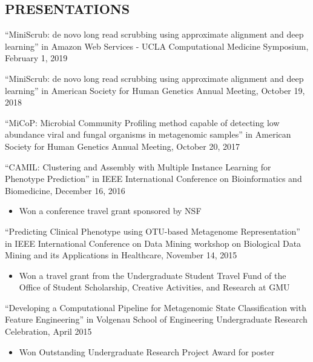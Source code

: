 \documentclass[margin, 10pt]{res} %
\begin{document}
\begin{resume}
\section{PRESENTATIONS}
``MiniScrub: de novo long read scrubbing using approximate alignment and deep learning'' in Amazon Web Services - UCLA Computational Medicine Symposium, February 1, 2019

``MiniScrub: de novo long read scrubbing using approximate alignment and deep learning'' in American Society for Human Genetics Annual Meeting, October 19, 2018

``MiCoP: Microbial Community Profiling method capable of detecting low abundance viral and fungal organisms in metagenomic samples'' in American Society for Human Genetics Annual Meeting, October 20, 2017

``CAMIL: Clustering and Assembly with Multiple Instance Learning for Phenotype Prediction'' in IEEE International Conference on Bioinformatics and Biomedicine, December 16, 2016
\begin{itemize} \itemsep -2pt %
\item Won a conference travel grant sponsored by NSF
\end{itemize}

``Predicting Clinical Phenotype using OTU-based Metagenome Representation'' in IEEE International Conference on Data Mining workshop on Biological Data Mining and its Applications in Healthcare, November 14, 2015
\begin{itemize} \itemsep -2pt %
\item Won a travel grant from the Undergraduate Student Travel Fund of the Office of Student Scholarship, Creative Activities, and Research at GMU
\end{itemize}

``Developing a Computational Pipeline for Metagenomic State Classification with Feature Engineering'' in Volgenau School of Engineering Undergraduate Research Celebration, April 2015
\begin{itemize} \itemsep -2pt %
\item Won Outstanding Undergraduate Research Project Award for poster
\end{itemize}


\end{resume}
\end{document}
